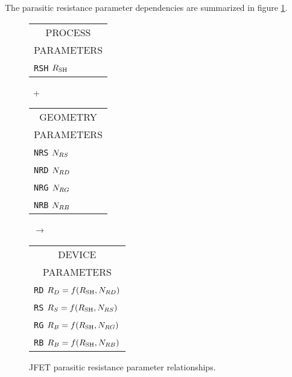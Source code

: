 The parasitic resistance parameter dependencies are summarized in
figure \ref{jpara}.\\[0.2in]
\begin{figure}[hbp]
\parbox[t]{1.3in}{
\begin{tabular}[t]{|p{1in}|}
\hline
\multicolumn{1}{|c|}{PROCESS} \\
\multicolumn{1}{|c|}{PARAMETERS} \\
\hline
{\tt RSH} \hfill $R_{\mbox{\scriptsize SH}}$\\
\hline
\end{tabular}
}
\hfill
\parbox{0.1in}{\ \vspace*{0.2in}\newline +}
\hfill
\begin{tabular}[t]{|p{1in}|}
\hline
\multicolumn{1}{|c|}{GEOMETRY} \\
\multicolumn{1}{|c|}{PARAMETERS} \\
\hline
{\tt NRS} \hfill $N_{RS}$\\
{\tt NRD} \hfill $N_{RD}$\\
{\tt NRG} \hfill $N_{RG}$\\
{\tt NRB} \hfill $N_{RB}$\\
\hline
\end{tabular}
\hfill
\parbox{0.1in}{\ \vspace*{0.2in}\newline $\rightarrow$}
\hfill
\begin{tabular}[t]{|p{1.8in}|}
\hline
\multicolumn{1}{|c|}{DEVICE} \\
\multicolumn{1}{|c|}{PARAMETERS} \\
\hline
{\tt RD} \hfill $R_D = f(R_{\mbox{\scriptsize SH}}, N_{RD})$ \\
{\tt RS} \hfill $R_S = f(R_{\mbox{\scriptsize SH}}, N_{RS})$ \\
{\tt RG} \hfill $R_B = f(R_{\mbox{\scriptsize SH}}, N_{RG})$ \\
{\tt RB} \hfill $R_B = f(R_{\mbox{\scriptsize SH}}, N_{RB})$ \\
\hline
\end{tabular}
\caption{JFET parasitic resistance parameter
relationships. \label{jpara}}
\end{figure}

